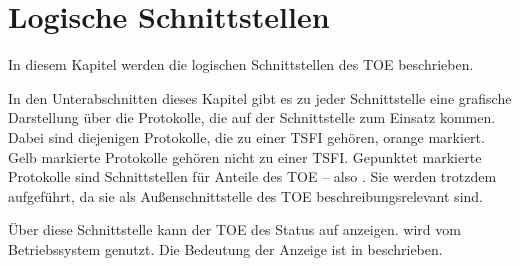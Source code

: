 \chapter{Logische Schnittstellen}\hypertarget{tsfi.ls}{\label{tsfi.ls}}

In diesem Kapitel werden die logischen Schnittstellen des TOE
beschrieben. 

In den Unterabschnitten dieses Kapitel gibt es zu jeder Schnittstelle eine
grafische Darstellung über die Protokolle, die auf der Schnittstelle zum Einsatz
kommen. Dabei sind diejenigen Protokolle, die zu einer TSFI gehören, orange
markiert. Gelb markierte Protokolle gehören nicht zu einer TSFI. Gepunktet
markierte Protokolle sind Schnittstellen für \nontsf{} Anteile des TOE -- also
. Sie werden trotzdem aufgeführt, da sie als
Außenschnittstelle des TOE beschreibungsrelevant sind.

\clearpage



\clearpage



\clearpage



Über diese Schnittstelle kann der TOE des Status auf 
anzeigen. \lsled{} wird vom Betriebssystem genutzt. Die Bedeutung der Anzeige
ist in \autocite[Kapitel 6]{agd_adm} beschrieben.


